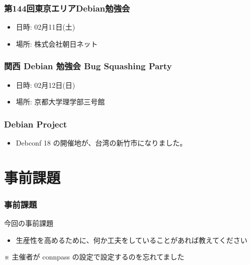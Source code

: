 \documentclass[cjk,dvipdfmx,12pt,compress,%
hyperref={bookmarks=true,bookmarksnumbered=true,bookmarksopen=false,%
colorlinks=false,%
pdftitle={第 120 回 関西 Debian 勉強会},%
pdfauthor={倉敷・のがた・佐々木・かわだ・おおつき},%
pdfsubject={資料},%
}]{beamer}
\begin{document}
%
%
%

\begin{frame}[fragile]
  \frametitle{第144回東京エリアDebian勉強会}
  \begin{itemize}
  \item 日時: 02月11日(土)
  \item 場所: 株式会社朝日ネット
  \end{itemize}
\end{frame}

\begin{frame}[fragile]
  \frametitle{関西 Debian 勉強会 Bug Squashing Party}
  \begin{itemize}
  \item 日時: 02月12日(日)
  \item 場所: 京都大学理学部三号館
  \end{itemize}
\end{frame}

\begin{frame}[fragile]
  \frametitle{Debian Project}
  \begin{itemize}
  \item Debconf 18 の開催地が、台湾の新竹市になりました。
  \end{itemize}
\end{frame}


\section{事前課題}

\begin{frame}[fragile]
  \frametitle{事前課題}
  \begin{block}{今回の事前課題}
   \begin{itemize}
   \item{生産性を高めるために、何か工夫をしていることがあれば教えてください}
  \end{itemize}
    ※ 主催者が connpass の設定で設定するのを忘れてました
  \end{block}
\end{frame}
\end{document}
